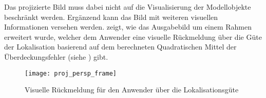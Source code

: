 Das projizierte Bild muss dabei nicht auf die Visualisierung der Modellobjekte beschränkt werden. Ergänzend kann das Bild mit weiteren visuellen Informationen versehen werden.  zeigt, wie das Ausgabebild um einem Rahmen erweitert wurde, welcher dem Anwender eine visuelle Rückmeldung über die Güte der Lokalisation basierend auf dem berechneten Quadratischen Mittel der Überdeckungsfehler (siehe ) gibt.\\

\prever{
}

\begin{figure}[!ht]
	\begin{center}
		\texttt{[image: proj\_persp\_frame]}
		\caption{Visuelle Rückmeldung für den Anwender über die Lokalisationsgüte}
		\label{fig.proj_rms}
	\end{center}
\end{figure}

\prever{
}